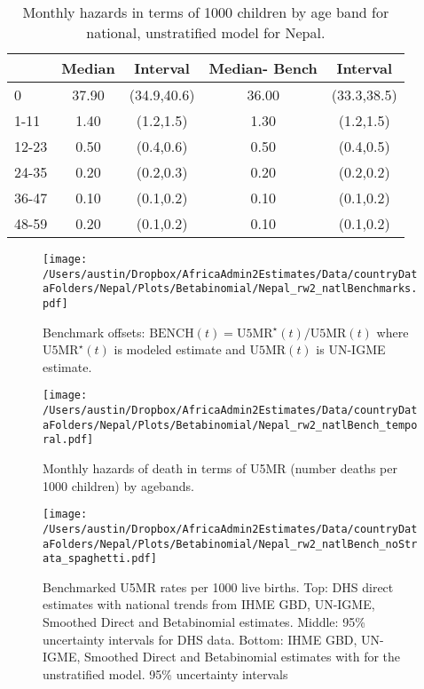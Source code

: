 \documentclass[]{article}
\begin{document}
\begin{table}[ht]
\centering
\begin{tabular}{l|cc|cc}
  \hline
 & Median & Interval & Median- Bench & Interval \\ 
  \hline
0 & 37.90 & (34.9,40.6) & 36.00 & (33.3,38.5) \\ 
  1-11 & 1.40 & (1.2,1.5) & 1.30 & (1.2,1.5) \\ 
  12-23 & 0.50 & (0.4,0.6) & 0.50 & (0.4,0.5) \\ 
  24-35 & 0.20 & (0.2,0.3) & 0.20 & (0.2,0.2) \\ 
  36-47 & 0.10 & (0.1,0.2) & 0.10 & (0.1,0.2) \\ 
  48-59 & 0.20 & (0.1,0.2) & 0.10 & (0.1,0.2) \\ 
   \hline
\end{tabular}
\caption{Monthly hazards in terms of 1000 children by age band for national, unstratified model for Nepal.} 
\end{table}

\begin{figure}
    \centering
    \texttt{[image: /Users/austin/Dropbox/AfricaAdmin2Estimates/Data/countryDataFolders/Nepal/Plots/Betabinomial/Nepal\_rw2\_natlBenchmarks.pdf]}
    \caption{Benchmark offsets: $
\mbox{BENCH}(t) = \mbox{U5MR}^\star(t)/\mbox{U5MR}(t)$ 
 where $\mbox{U5MR}^\star(t)$ is modeled estimate and  $\mbox{U5MR}(t)
$ is UN-IGME estimate.}
\end{figure}

\begin{figure}
    \centering
    \texttt{[image: /Users/austin/Dropbox/AfricaAdmin2Estimates/Data/countryDataFolders/Nepal/Plots/Betabinomial/Nepal\_rw2\_natlBench\_temporal.pdf]}
    \caption{Monthly hazards of death in terms of U5MR (number deaths per 1000 children) by agebands.}
\end{figure}
\clearpage

\begin{figure}
    \centering
    \texttt{[image: /Users/austin/Dropbox/AfricaAdmin2Estimates/Data/countryDataFolders/Nepal/Plots/Betabinomial/Nepal\_rw2\_natlBench\_noStrata\_spaghetti.pdf]}
    \caption{Benchmarked U5MR rates per 1000 live births. Top: DHS direct estimates with national trends from IHME GBD, UN-IGME, Smoothed Direct and Betabinomial estimates. Middle: 95\% uncertainty intervals for DHS data. Bottom: IHME GBD, UN-IGME, Smoothed Direct and Betabinomial estimates with for the unstratified model. 95\% uncertainty intervals}
\end{figure}
\clearpage
\end{document}
